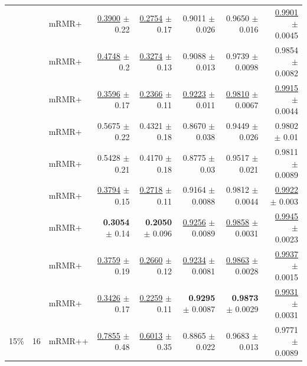 \begin{longtable}{llp{}rrrrr}
 &  & mRMR+ & \underline{0.3900} {\scriptsize $\pm$ 0.22} & \underline{0.2754} {\scriptsize $\pm$ 0.17} & 0.9011 {\scriptsize $\pm$ 0.026} & 0.9650 {\scriptsize $\pm$ 0.016} & \underline{0.9901} {\scriptsize $\pm$ 0.0045} \\
 &  & mRMR+ & \underline{0.4748} {\scriptsize $\pm$ 0.2} & \underline{0.3274} {\scriptsize $\pm$ 0.13} & 0.9088 {\scriptsize $\pm$ 0.013} & 0.9739 {\scriptsize $\pm$ 0.0098} & 0.9854 {\scriptsize $\pm$ 0.0082} \\
 &  & mRMR+ & \underline{0.3596} {\scriptsize $\pm$ 0.17} & \underline{0.2366} {\scriptsize $\pm$ 0.11} & \underline{0.9223} {\scriptsize $\pm$ 0.011} & \underline{0.9810} {\scriptsize $\pm$ 0.0067} & \underline{0.9915} {\scriptsize $\pm$ 0.0044} \\
 &  & mRMR+ & 0.5675 {\scriptsize $\pm$ 0.22} & 0.4321 {\scriptsize $\pm$ 0.18} & 0.8670 {\scriptsize $\pm$ 0.038} & 0.9449 {\scriptsize $\pm$ 0.026} & 0.9802 {\scriptsize $\pm$ 0.01} \\
 &  & mRMR+ & 0.5428 {\scriptsize $\pm$ 0.21} & 0.4170 {\scriptsize $\pm$ 0.18} & 0.8775 {\scriptsize $\pm$ 0.03} & 0.9517 {\scriptsize $\pm$ 0.021} & 0.9811 {\scriptsize $\pm$ 0.0089} \\
 &  & mRMR+ & \underline{0.3794} {\scriptsize $\pm$ 0.15} & \underline{0.2718} {\scriptsize $\pm$ 0.11} & 0.9164 {\scriptsize $\pm$ 0.0088} & 0.9812 {\scriptsize $\pm$ 0.0044} & \underline{0.9922} {\scriptsize $\pm$ 0.003} \\
 &  & mRMR+ & \textbf{0.3054} {\scriptsize $\pm$ 0.14} & \textbf{0.2050} {\scriptsize $\pm$ 0.096} & \underline{0.9256} {\scriptsize $\pm$ 0.0089} & \underline{0.9858} {\scriptsize $\pm$ 0.0031} & \underline{0.9945} {\scriptsize $\pm$ 0.0023} \\
 &  & mRMR+ & \underline{0.3759} {\scriptsize $\pm$ 0.19} & \underline{0.2660} {\scriptsize $\pm$ 0.12} & \underline{0.9234} {\scriptsize $\pm$ 0.0081} & \underline{0.9863} {\scriptsize $\pm$ 0.0028} & \underline{0.9937} {\scriptsize $\pm$ 0.0015} \\
 &  & mRMR+ & \underline{0.3426} {\scriptsize $\pm$ 0.17} & \underline{0.2259} {\scriptsize $\pm$ 0.11} & \textbf{0.9295} {\scriptsize $\pm$ 0.0087} & \textbf{0.9873} {\scriptsize $\pm$ 0.0029} & \underline{0.9931} {\scriptsize $\pm$ 0.0031} \\
\midrule
15\% & 16 & mRMR++ & \underline{0.7855} {\scriptsize $\pm$ 0.48} & \underline{0.6013} {\scriptsize $\pm$ 0.35} & 0.8865 {\scriptsize $\pm$ 0.022} & 0.9683 {\scriptsize $\pm$ 0.013} & 0.9771 {\scriptsize $\pm$ 0.0089} \\

\end{longtable}
